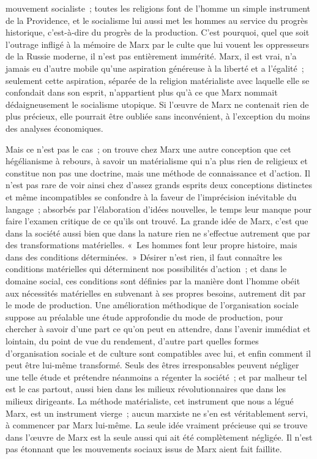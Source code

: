 \documentclass[french,twoside]{book} %
\begin{document}
mouvement socialiste ; toutes les religions font de l'homme un simple instrument de la Providence, et le socialisme lui aussi met les hommes au service du progrès historique, c'est-à-dire du progrès de la production. C'est pourquoi, quel que soit l'outrage infligé à la mémoire de Marx par le culte que lui vouent les oppresseurs de la Russie moderne, il n'est pas entièrement immérité. Marx, il est vrai, n'a jamais eu d'autre mobile qu'une aspiration généreuse à la liberté et a l'égalité ; seulement cette aspiration, séparée de la religion matérialiste avec laquelle elle se confondait dans son esprit, n'appartient plus qu'à ce que Marx nommait dédaigneusement le socialisme utopique. Si l'œuvre de Marx ne contenait rien de plus précieux, elle pourrait être oubliée sans inconvénient, à l'exception du moins des analyses économiques.\par
Mais ce n'est pas le cas ; on trouve chez Marx une autre conception que cet hégélianisme à rebours, à savoir un matérialisme qui n'a plus rien de religieux et constitue non pas une doctrine, mais une méthode de connaissance et d'action. Il n'est pas rare de voir ainsi chez d'assez grands esprits deux conceptions distinctes et même incompatibles se confondre à la faveur de l'imprécision inévitable du langage ; absorbés par l'élaboration d'idées nouvelles, le temps leur manque pour faire l'examen critique de ce qu'ils ont trouvé. La grande idée de Marx, c'est que dans la société aussi bien que dans la nature rien ne s'effectue autrement que par des transformations matérielles. « Les hommes font leur propre histoire, mais dans des conditions déterminées. » Désirer n'est rien, il faut connaître les conditions matérielles qui déterminent nos possibilités d'action ; et dans le domaine social, ces conditions sont définies par la manière dont l'homme obéit aux nécessités matérielles en subvenant à ses propres besoins, autrement dit par le mode de production. Une amélioration méthodique de l'organisation sociale suppose au préalable une étude approfondie du mode de production, pour chercher à savoir d'une part ce qu'on peut en attendre, dans l'avenir immédiat et lointain, du point de vue du rendement, d'autre part quelles formes d'organisation sociale et de culture sont compatibles avec lui, et enfin comment il peut être lui-même transformé. Seuls des êtres irresponsables peuvent négliger une telle étude et prétendre néanmoins a régenter la société ; et par malheur tel est le cas partout, aussi bien dans les milieux révolutionnaires que dans les milieux dirigeants. La méthode matérialiste, cet instrument que nous a légué Marx, est un instrument vierge ; aucun marxiste ne s'en est véritablement servi, à commencer par Marx lui-même. La seule idée vraiment précieuse qui se trouve dans l'œuvre de Marx est la seule aussi qui ait été complètement négligée. Il n'est pas étonnant que les mouvements sociaux issus de Marx aient fait faillite.\par
\end{document}

